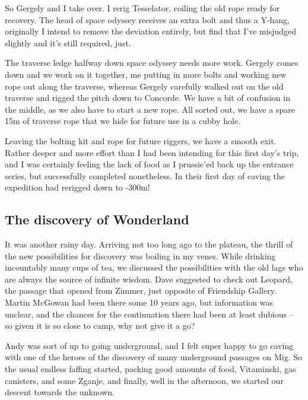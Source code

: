 So Gergely and I take over. I rerig Tesselator, coiling the old rope
ready for recovery. The head of space odyssey receives an extra bolt and
thus a Y-hang, originally I intend to remove the deviation entirely, but
find that I've misjudged slightly and it's still required, just.

The traverse ledge halfway down space odyssey needs more work. Gergely
comes down and we work on it together, me putting in more bolts and
working new rope out along the traverse, whereas Gergely carefully
walked out on the old traverse and rigged the pitch down to Concorde. We
have a bit of confusion in the middle, as we also have to start a new
rope. All sorted out, we have a spare 15m of traverse rope that we hide
for future use in a cubby hole.

Leaving the bolting kit and rope for future riggers, we have a smooth
exit. Rather deeper and more effort than I had been intending for this
first day's trip, and I was certainly feeling the lack of food as I
prussic'ed back up the entrance series, but successfully completed
nonetheless. In their first day of caving the expedition had rerigged
down to -300m!


\hypertarget{the-discovery-of-wonderland}{%
\subsection{The discovery of
Wonderland}\label{the-discovery-of-wonderland}}

It was another rainy day. Arriving not too long ago to the plateau, the
thrill of the new possibilities for discovery was boiling in my venes.
While drinking incountably many cups of tea, we discussed the
possibilities with the old lags who are always the source of infinite
wisdom. Dave suggested to check out Leopard, the passage that opened
from Zimmer, just opposite of Friendship Gallery. Martin McGowan had
been there some 10 years ago, but information was unclear, and the
chances for the continuation there had been at least dubious -- so given
it is so close to camp, why not give it a go?

Andy was sort of up to going underground, and I felt super happy to go
caving with one of the heroes of the discovery of many underground
passages on Mig. So the usual endless faffing started, packing good
amounts of food, Vitaminski, gas canisters, and some Zganje, and
finally, well in the afternoon, we started our descent towards the
unknown.

